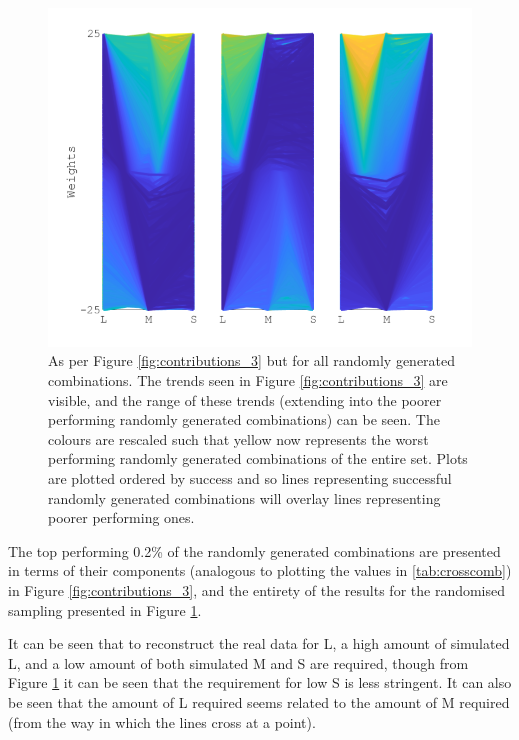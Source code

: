 \begin{figure}[htbp]
\includegraphics[max width=\textwidth]{figs/LargeSphere/contributions_all.pdf}
\caption{As per Figure \ref{fig:contributions_3} but for all randomly generated combinations. The trends seen in Figure \ref{fig:contributions_3} are visible, and the range of these trends (extending into the poorer performing randomly generated combinations) can be seen. The colours are rescaled such that yellow now represents the worst performing randomly generated combinations of the entire set. Plots are plotted ordered by success and so lines representing successful randomly generated combinations will overlay lines representing poorer performing ones.}
\label{fig:contributions_all}
\end{figure}

The top performing 0.2\% of the randomly generated combinations are presented in terms of their components (analogous to plotting the values in \ref{tab:crosscomb}) in Figure \ref{fig:contributions_3}, and the entirety of the results for the randomised sampling presented in Figure \ref{fig:contributions_all}. 

It can be seen that to reconstruct the real data for L, a high amount of simulated L, and a low amount of both simulated M and S are required, though from Figure \ref{fig:contributions_all} it can be seen that the requirement for low S is less stringent. It can also be seen that the amount of L required seems related to the amount of M required (from the way in which the lines cross at a point).

